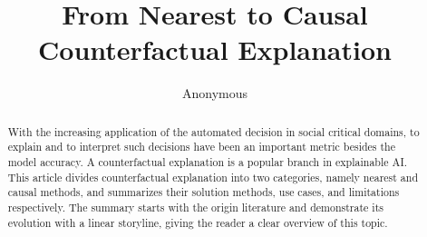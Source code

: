 \documentclass[runningheads]{llncs}
\begin{document}
%
\title{From Nearest to Causal Counterfactual Explanation}
%
%
\author{Anonymous
}

%
\maketitle              %
%
\begin{abstract}
With the increasing application of the automated decision in social critical domains, to explain and to interpret such decisions have been an important metric besides the model accuracy. A counterfactual explanation is a popular branch in explainable AI. This article divides counterfactual explanation into two categories, namely nearest and causal methods, and summarizes their solution methods, use cases, and limitations respectively. The summary starts with the origin literature and demonstrate its evolution with a linear storyline, giving the reader a clear overview of this topic.


\end{abstract}
%

%


%





%
%
% 
% 
%

%
{}
\end{document}
